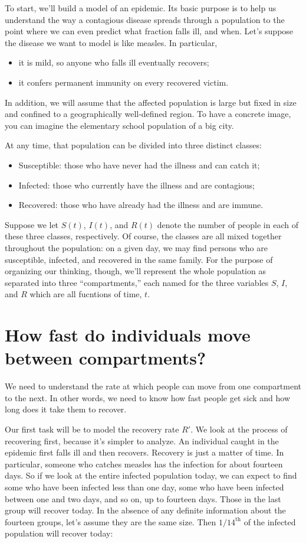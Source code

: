 \documentclass
[justified,nohyper]
{tufte-handout}
\begin{document}
To start, we'll build a model of an epidemic. Its basic purpose is to help us 
understand the way a contagious disease spreads through a population to the point 
where we can even predict what fraction falls ill, and when. Let's suppose the 
disease we want to model is like measles. In particular,
\begin{itemize}
    \item it is mild, so anyone who falls ill eventually recovers;
    \item it confers permanent immunity on every recovered victim.
\end{itemize}

In addition, we will assume that the affected population is large but fixed in 
size and confined to a geographically well-defined region. To have a concrete 
image, you can imagine the elementary school population of a big city.

At any time, that population can be divided into three distinct classes:
\begin{itemize}
    \item Susceptible: those who have never had the illness and can catch it;
    \item Infected: those who currently have the illness and are contagious;
    \item Recovered: those who have already had the illness and are immune.
\end{itemize}

Suppose we let $S(t)$, $I(t)$, and $R(t)$ denote the number of people in
each of these 
three classes, respectively. Of course, the classes are all mixed together 
throughout the population: on a given day, we may find persons who are 
susceptible, infected, and recovered in the same family. For the purpose of 
organizing our thinking, though, we'll represent the whole population as 
separated into three ``compartments,'' each named for the three variables $S$, 
$I$, and $R$ which are all fucntions of time, $t$.

\section{How fast do individuals move between compartments?} 
We need to understand the rate at which people can move from one compartment to 
the next. In other words, we need to know how fast people get sick and how long 
does it take them to recover.

Our first task will be to model the recovery rate $R'$. We look at the process of 
recovering first, because it's simpler to analyze. An individual caught in the 
epidemic first falls ill and then recovers. Recovery is just a matter of time. In 
particular, someone who catches measles has the infection for about fourteen 
days. So if we look at the entire infected population today, we can expect to 
find some who have been infected less than one day, some who have been infected 
between one and two days, and so on, up to fourteen days. Those in the last group 
will recover today. In the absence of any definite information about the fourteen 
groups, let's assume they are the same size. Then $1/14^{\text{th}}$ of the 
infected population will recover today:
\end{document}
